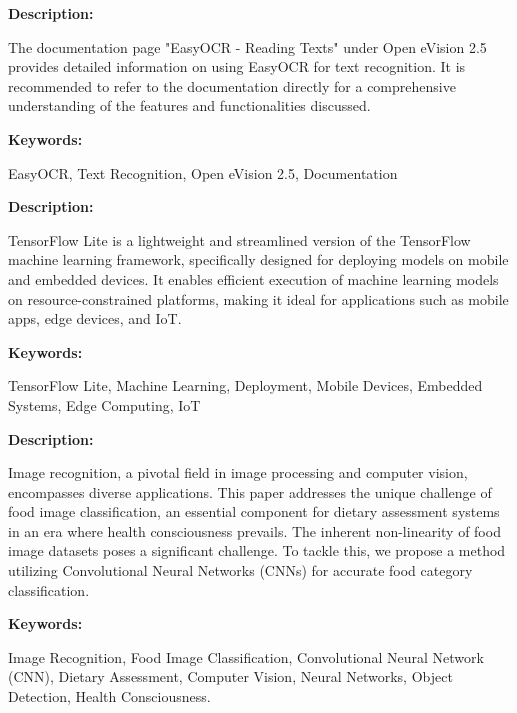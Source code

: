 
{ 
	
	\textbf{Description:}
	
	The documentation page "EasyOCR - Reading Texts" under Open eVision 2.5 provides detailed information on using EasyOCR for text recognition. It is recommended to refer to the documentation directly for a comprehensive understanding of the features and functionalities discussed.\autocite{EasyOCR:2018}

	
	\textbf{Keywords:} 
	
	EasyOCR, Text Recognition, Open eVision 2.5, Documentation
	
		
}



{ 
	
	\textbf{Description:}
	
	TensorFlow Lite is a lightweight and streamlined version of the TensorFlow machine learning framework, specifically designed for deploying models on mobile and embedded devices. It enables efficient execution of machine learning models on resource-constrained platforms, making it ideal for applications such as mobile apps, edge devices, and IoT.\autocite{GoogleTensorFlow:2022}

	
	
	\textbf{Keywords:} 
	
	TensorFlow Lite, Machine Learning, Deployment, Mobile Devices, Embedded Systems, Edge Computing, IoT
	
}




{ 
	
	\textbf{Description:}
	
	Image recognition, a pivotal field in image processing and computer vision, encompasses diverse applications. This paper addresses the unique challenge of food image classification, an essential component for dietary assessment systems in an era where health consciousness prevails. The inherent non-linearity of food image datasets poses a significant challenge. To tackle this, we propose a method utilizing Convolutional Neural Networks (CNNs) for accurate food category classification.\autocite{Islam:2018}

	
	
	
	\textbf{Keywords:} 
	
	Image Recognition, Food Image Classification, Convolutional Neural Network (CNN), Dietary Assessment, Computer Vision, Neural Networks, Object Detection, Health Consciousness.

	
}



